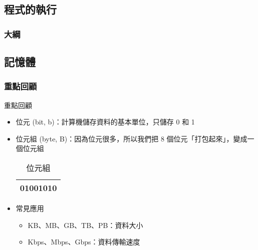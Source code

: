 \documentclass[utf8]{beamer}
\begin{document}
\begin{CJK}{UTF8}{bkai}
\section{程式的執行}
\begin{frame}
  \frametitle{大綱}
  \begin{multicols}{2}
    \tableofcontents[currentsection]
  \end{multicols}
\end{frame}

\subsection{記憶體}

\begin{frame}
  \frametitle{重點回顧}
  \begin{exampleblock}{重點回顧}
    \begin{itemize}[<+->]
    \item \alert{位元} (bit, b)：計算機儲存資料的基本單位，只儲存 \alert{0 和 1}
    \item \alert{位元組} (byte, B)：因為位元很多，所以我們把 8 個位元「打包起來」，變成一個位元組
      \begin{table}[h]
        \begin{tabular}{|c|}
        \hline
        01001010\\
        \hline
        \end{tabular}
        \caption{位元組}
      \end{table}
    \item 常見應用
      \begin{itemize}
      \item KB、MB、GB、TB、PB：資料大小
      \item Kbps、Mbps、Gbps：資料傳輸速度
      \end{itemize}
    \end{itemize}
  \end{exampleblock}
\end{frame}


\end{CJK}
\end{document}
